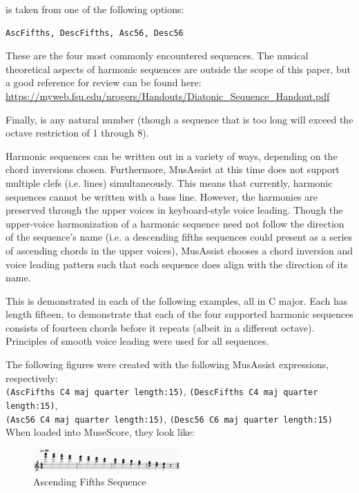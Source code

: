 \documentclass{report}
\newcommand\param[1]{\textttu{<#1>}}
\begin{document}
\param{HARMSEQTYPE} is taken from one of the following options:
\begin{verbatim}
AscFifths, DescFifths, Asc56, Desc56
\end{verbatim}

These are the four most commonly encountered sequences. The musical theoretical aspects of harmonic sequences are outside the scope of this paper, but a good reference for review can be found here: \href{https://myweb.fsu.edu/nrogers/Handouts/Diatonic_Sequence_Handout.pdf}{https://myweb.fsu.edu/nrogers/Handouts/Diatonic\_Sequence\_Handout.pdf}

Finally, \param{LENGTH} is any natural number (though a sequence that is too long will exceed the octave restriction of 1 through 8).

Harmonic sequences can be written out in a variety of ways, depending on the chord inversions chosen. Furthermore, MusAssist at this time does not support multiple clefs (i.e. lines) simultaneously. This means that currently, harmonic sequences cannot be written with a bass line. However, the harmonies are preserved through the upper voices in keyboard-style voice leading. Though the upper-voice harmonization of a harmonic sequence need not follow the direction of the sequence's name (i.e. a descending fifths sequences could present as a series of ascending chords in the upper voices), MusAssist chooses a chord inversion and voice leading pattern such that each sequence does align with the direction of its name. 

This is demonstrated in each of the following examples, all in C major. Each has length fifteen, to demonstrate that each of the four supported harmonic sequences consists of fourteen chords before it repeats (albeit in a different octave). Principles of smooth voice leading were used for all sequences.

The following figures were created with the following MusAssist expressions, respectively: \\\verb.(AscFifths C4 maj quarter length:15)., \verb.(DescFifths C4 maj quarter length:15)., \\\verb.(Asc56 C4 maj quarter length:15)., \verb.(Desc56 C6 maj quarter length:15). When loaded into MuseScore, they look like:

\begin{figure}[h!]
\centering
\includegraphics[width=0.5\textwidth]{images/ascfifths}
  \caption{Ascending Fifths Sequence}
\end{figure}
\end{document}
